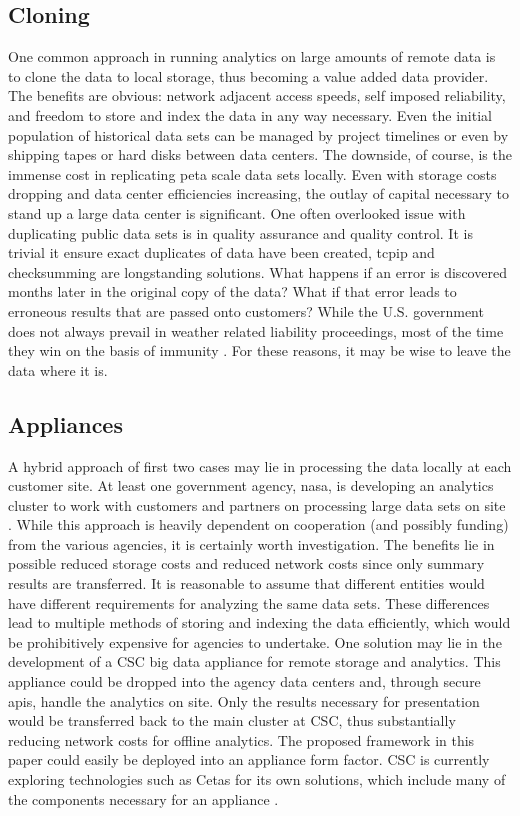 \subsection{Cloning}
One common approach in running analytics on large amounts of remote data is to clone the data to local storage, thus becoming a value added data provider. The benefits are obvious: network adjacent access speeds, self imposed reliability, and freedom to store and index the data in any way necessary. Even the initial population of historical data sets can be managed by project timelines or even by shipping tapes or hard disks between data centers. The downside, of course, is the immense cost in replicating peta scale data sets locally. Even with storage costs dropping and data center efficiencies increasing, the outlay of capital necessary to stand up a large data center is significant. One often overlooked issue with duplicating public data sets is in quality assurance and quality control. It is trivial it ensure exact duplicates of data have been created, \gls{tcpip} and checksumming are longstanding solutions. What happens if an error is discovered months later in the original copy of the data? What if that error leads to erroneous results that are passed onto customers?  While the U.S. government does not always prevail in weather related liability proceedings, most of the time they win on the basis of immunity \cite[Chapter~4]{fairweather}. For these reasons, it may be wise to leave the data where it is.
\subsection{Appliances}
A hybrid approach of first two cases may lie in processing the data locally at each customer site. At least one government agency, \gls{nasa}, is developing an analytics cluster to work with customers and partners on processing large data sets on site \cite{duffy}. While this approach is heavily dependent on cooperation (and possibly funding) from the various agencies, it is certainly worth investigation. The benefits lie in possible reduced storage costs and reduced network costs since only summary results are transferred. It is reasonable to assume that different entities would have different requirements for analyzing the same data sets. These differences lead to multiple methods of storing and indexing the data efficiently, which would be prohibitively expensive for agencies to undertake.  One solution may lie in the development of a \textsc{CSC} big data appliance for remote storage and analytics. This appliance could be dropped into the agency data centers and, through secure \gls{api}s, handle the analytics on site. Only the results necessary for presentation would be transferred back to the main cluster at \textsc{CSC}, thus substantially reducing network costs for offline analytics. The proposed framework in this paper could easily be deployed into an appliance form factor. \textsc{CSC} is currently exploring technologies such as Cetas for its own solutions,  which include many of the components necessary for an appliance \cite{cetas}.\\

